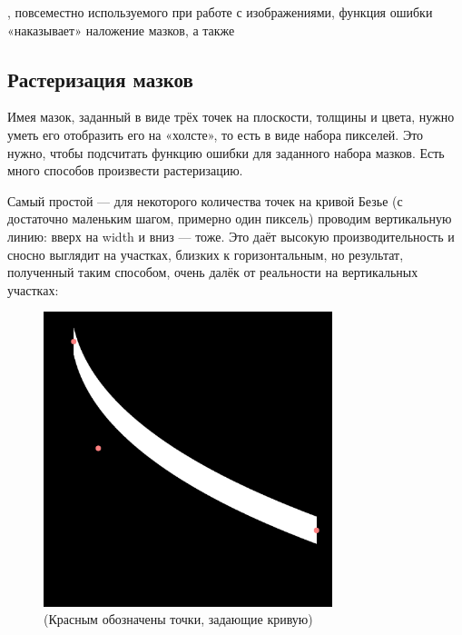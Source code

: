 \documentclass[11pt]{article}
\begin{document}
    , повсеместно используемого при работе с изображениями, функция ошибки «наказывает» наложение мазков, а также

    \subsection{Растеризация мазков}\label{subsec:rasterization}
    Имея мазок, заданный в виде трёх точек на плоскости, толщины и цвета, нужно уметь его отобразить его на «холсте», то есть в виде набора пикселей.
    Это нужно, чтобы подсчитать функцию ошибки для заданного набора мазков.
    Есть много способов произвести растеризацию.

    Самый простой — для некоторого количества точек на кривой Безье (с достаточно маленьким шагом, примерно один пиксель) проводим вертикальную линию: вверх на width и  вниз — тоже.
    Это даёт высокую производительность и сносно выглядит на участках, близких к горизонтальным, но результат, полученный таким способом, очень далёк от реальности на вертикальных участках:
    \begin{figure}[h!]
        \centering
        \includegraphics[width=0.75\textwidth]{stroke_vertical.png}
        \caption{(Красным обозначены точки, задающие кривую)}
        \label{fig:vertical_stroke}
    \end{figure}
\end{document}
